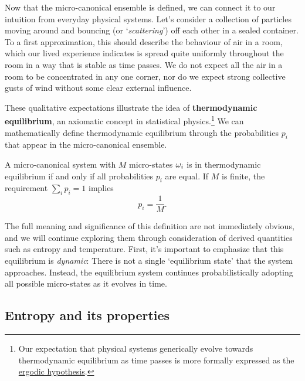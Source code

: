 Now that the micro-canonical ensemble is defined, we can connect it to our intuition from everyday physical systems.
Let's consider a collection of particles moving around and bouncing (or `\textit{scattering}') off each other in a sealed container.
To a first approximation, this should describe the behaviour of air in a room, which our lived experience indicates is spread quite uniformly throughout the room in a way that is stable as time passes.
We do not expect all the air in a room to be concentrated in any one corner, nor do we expect strong collective gusts of wind without some clear external influence.

These qualitative expectations illustrate the idea of \textbf{thermodynamic equilibrium}, an axiomatic concept in statistical physics.\footnote{Our expectation that physical systems generically evolve towards thermodynamic equilibrium as time passes is more formally expressed as the \href{https://en.wikipedia.org/wiki/Ergodic_hypothesis}{ergodic hypothesis}.}
We can mathematically define thermodynamic equilibrium through the probabilities $p_i$ that appear in the micro-canonical ensemble.

\begin{shaded}
  A micro-canonical system \Om with $M$ micro-states $\omega_i$ is in thermodynamic equilibrium if and only if all probabilities $p_i$ are equal.
  If $M$ is finite, the requirement $\sum_i p_i = 1$ implies
  \begin{equation}
    \label{eq:micro_equil}
    p_i = \frac{1}{M}.
  \end{equation}
\end{shaded}

The full meaning and significance of this definition are not immediately obvious, and we will continue exploring them through consideration of derived quantities such as entropy and temperature.
First, it's important to emphasize that this equilibrium is \textit{dynamic}: There is not a single `equilibrium state' that the system approaches.
Instead, the equilibrium system continues probabilistically adopting all possible micro-states as it evolves in time. %



\subsection{\label{sec:entropy}Entropy and its properties}
